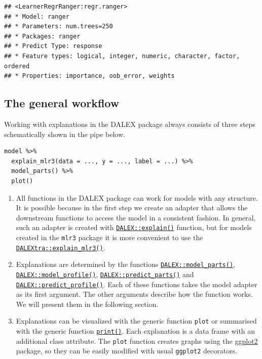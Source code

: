 \documentclass[]{scrbook}
\begin{document}
\begin{verbatim}
## <LearnerRegrRanger:regr.ranger>
## * Model: ranger
## * Parameters: num.trees=250
## * Packages: ranger
## * Predict Type: response
## * Feature types: logical, integer, numeric, character, factor, ordered
## * Properties: importance, oob_error, weights
\end{verbatim}

\hypertarget{interpretability-architecture}{%
\subsection{The general workflow}\label{interpretability-architecture}}

Working with explanations in the DALEX package always consists of three steps schematically shown in the pipe below.

\begin{verbatim}
model %>%
  explain_mlr3(data = ..., y = ..., label = ...) %>%
  model_parts() %>%
  plot()
\end{verbatim}

\begin{enumerate}
\def\labelenumi{\arabic{enumi}.}
\item
  All functions in the DALEX package can work for models with any structure. It is possible because in the first step we create an adapter that allows the downstream functions to access the model in a consistent fashion. In general, such an adapter is created with \href{https://www.rdocumentation.org/packages/DALEX/topics/explain}{\texttt{DALEX::explain()}} function, but for models created in the \texttt{mlr3} package it is more convenient to use the \href{https://www.rdocumentation.org/packages/DALEXtra/topics/explain_mlr3}{\texttt{DALEXtra::explain\_mlr3()}}.
\item
  Explanations are determined by the functions \href{https://www.rdocumentation.org/packages/DALEX/topics/model_parts}{\texttt{DALEX::model\_parts()}}, \href{https://www.rdocumentation.org/packages/DALEX/topics/model_profile}{\texttt{DALEX::model\_profile()}}, \href{https://www.rdocumentation.org/packages/DALEX/topics/predict_parts}{\texttt{DALEX::predict\_parts()}} and \href{https://www.rdocumentation.org/packages/DALEX/topics/predict_profile}{\texttt{DALEX::predict\_profile()}}. Each of these functions takes the model adapter as its first argument. The other arguments describe how the function works. We will present them in the following section.
\item
  Explanations can be visualized with the generic function \texttt{plot} or summarised with the generic function \href{https://www.rdocumentation.org/packages/base/topics/print}{\texttt{print()}}. Each explanation is a data frame with an additional class attribute. The \texttt{plot} function creates graphs using the \href{https://cran.r-project.org/package=ggplot2}{ggplot2} package, so they can be easily modified with usual \texttt{ggplot2} decorators.
\end{enumerate}
\end{document}
